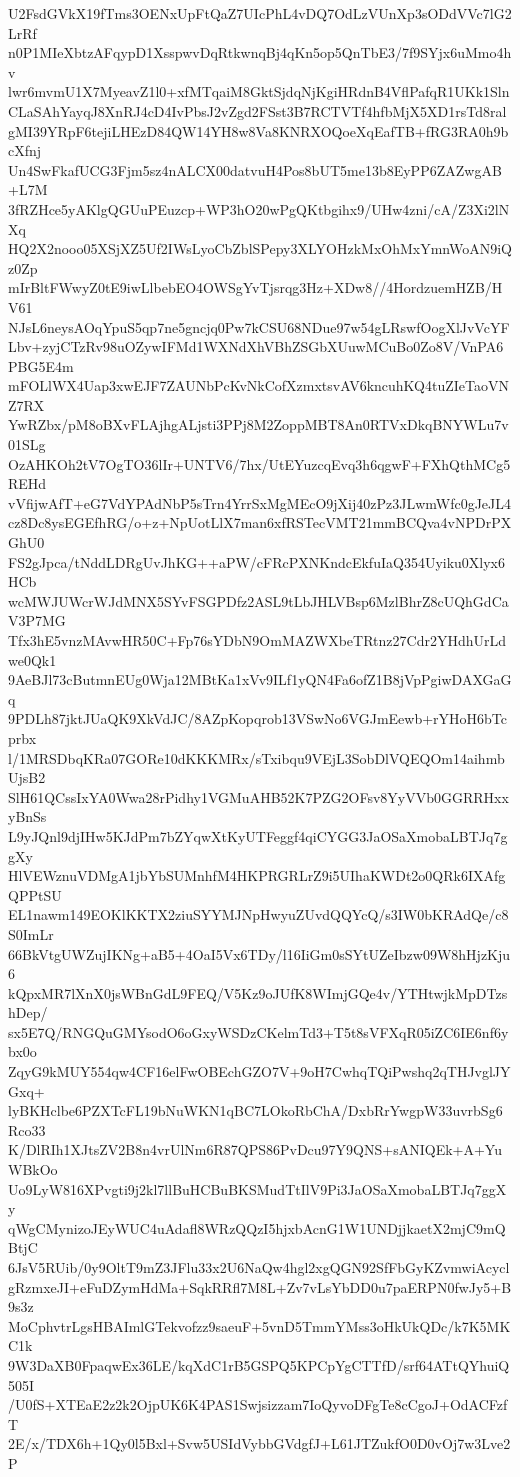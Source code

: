 U2FsdGVkX19fTms3OENxUpFtQaZ7UIcPhL4vDQ7OdLzVUnXp3sODdVVc7lG2LrRf
n0P1MIeXbtzAFqypD1XsspwvDqRtkwnqBj4qKn5op5QnTbE3/7f9SYjx6uMmo4hv
lwr6mvmU1X7MyeavZ1l0+xfMTqaiM8GktSjdqNjKgiHRdnB4VflPafqR1UKk1Sln
CLaSAhYayqJ8XnRJ4cD4IvPbsJ2vZgd2FSst3B7RCTVTf4hfbMjX5XD1rsTd8ral
gMI39YRpF6tejiLHEzD84QW14YH8w8Va8KNRXOQoeXqEafTB+fRG3RA0h9bcXfnj
Un4SwFkafUCG3Fjm5sz4nALCX00datvuH4Pos8bUT5me13b8EyPP6ZAZwgAB+L7M
3fRZHce5yAKlgQGUuPEuzcp+WP3hO20wPgQKtbgihx9/UHw4zni/cA/Z3Xi2lNXq
HQ2X2nooo05XSjXZ5Uf2IWsLyoCbZblSPepy3XLYOHzkMxOhMxYmnWoAN9iQz0Zp
mIrBltFWwyZ0tE9iwLlbebEO4OWSgYvTjsrqg3Hz+XDw8//4HordzuemHZB/HV61
NJsL6neysAOqYpuS5qp7ne5gncjq0Pw7kCSU68NDue97w54gLRswfOogXlJvVcYF
Lbv+zyjCTzRv98uOZywIFMd1WXNdXhVBhZSGbXUuwMCuBo0Zo8V/VnPA6PBG5E4m
mFOLlWX4Uap3xwEJF7ZAUNbPcKvNkCofXzmxtsvAV6kncuhKQ4tuZIeTaoVNZ7RX
YwRZbx/pM8oBXvFLAjhgALjsti3PPj8M2ZoppMBT8An0RTVxDkqBNYWLu7v01SLg
OzAHKOh2tV7OgTO36lIr+UNTV6/7hx/UtEYuzcqEvq3h6qgwF+FXhQthMCg5REHd
vVfijwAfT+eG7VdYPAdNbP5sTrn4YrrSxMgMEcO9jXij40zPz3JLwmWfc0gJeJL4
cz8Dc8ysEGEfhRG/o+z+NpUotLlX7man6xfRSTecVMT21mmBCQva4vNPDrPXGhU0
FS2gJpca/tNddLDRgUvJhKG++aPW/cFRcPXNKndcEkfuIaQ354Uyiku0Xlyx6HCb
wcMWJUWcrWJdMNX5SYvFSGPDfz2ASL9tLbJHLVBsp6MzlBhrZ8cUQhGdCaV3P7MG
Tfx3hE5vnzMAvwHR50C+Fp76sYDbN9OmMAZWXbeTRtnz27Cdr2YHdhUrLdwe0Qk1
9AeBJl73cButmnEUg0Wja12MBtKa1xVv9ILf1yQN4Fa6ofZ1B8jVpPgiwDAXGaGq
9PDLh87jktJUaQK9XkVdJC/8AZpKopqrob13VSwNo6VGJmEewb+rYHoH6bTcprbx
l/1MRSDbqKRa07GORe10dKKKMRx/sTxibqu9VEjL3SobDlVQEQOm14aihmbUjsB2
SlH61QCssIxYA0Wwa28rPidhy1VGMuAHB52K7PZG2OFsv8YyVVb0GGRRHxxyBnSs
L9yJQnl9djIHw5KJdPm7bZYqwXtKyUTFeggf4qiCYGG3JaOSaXmobaLBTJq7ggXy
HlVEWznuVDMgA1jbYbSUMnhfM4HKPRGRLrZ9i5UIhaKWDt2o0QRk6IXAfgQPPtSU
EL1nawm149EOKlKKTX2ziuSYYMJNpHwyuZUvdQQYcQ/s3IW0bKRAdQe/c8S0ImLr
66BkVtgUWZujIKNg+aB5+4OaI5Vx6TDy/l16IiGm0sSYtUZeIbzw09W8hHjzKju6
kQpxMR7lXnX0jsWBnGdL9FEQ/V5Kz9oJUfK8WImjGQe4v/YTHtwjkMpDTzshDep/
sx5E7Q/RNGQuGMYsodO6oGxyWSDzCKelmTd3+T5t8sVFXqR05iZC6IE6nf6ybx0o
ZqyG9kMUY554qw4CF16elFwOBEchGZO7V+9oH7CwhqTQiPwshq2qTHJvglJYGxq+
lyBKHclbe6PZXTcFL19bNuWKN1qBC7LOkoRbChA/DxbRrYwgpW33uvrbSg6Rco33
K/DlRIh1XJtsZV2B8n4vrUlNm6R87QPS86PvDcu97Y9QNS+sANIQEk+A+YuWBkOo
Uo9LyW816XPvgti9j2kl7llBuHCBuBKSMudTtIlV9Pi3JaOSaXmobaLBTJq7ggXy
qWgCMynizoJEyWUC4uAdafl8WRzQQzI5hjxbAcnG1W1UNDjjkaetX2mjC9mQBtjC
6JsV5RUib/0y9OltT9mZ3JFlu33x2U6NaQw4hgl2xgQGN92SfFbGyKZvmwiAcycl
gRzmxeJI+eFuDZymHdMa+SqkRRfl7M8L+Zv7vLsYbDD0u7paERPN0fwJy5+B9s3z
MoCphvtrLgsHBAImlGTekvofzz9saeuF+5vnD5TmmYMss3oHkUkQDc/k7K5MKC1k
9W3DaXB0FpaqwEx36LE/kqXdC1rB5GSPQ5KPCpYgCTTfD/srf64ATtQYhuiQ505I
/U0fS+XTEaE2z2k2OjpUK6K4PAS1Swjsizzam7IoQyvoDFgTe8cCgoJ+OdACFzfT
2E/x/TDX6h+1Qy0l5Bxl+Svw5USIdVybbGVdgfJ+L61JTZukfO0D0vOj7w3Lve2P
